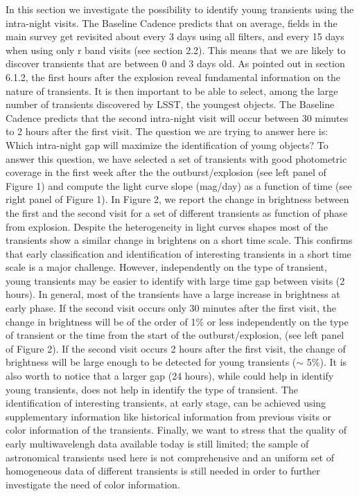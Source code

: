 In this section we investigate the possibility to identify young transients using the intra-night visits. The Baseline Cadence predicts that on average, fields in the main survey get revisited about every 3 days using all filters, and every 15 days when using only r band visits (see section 2.2).  This means that we are likely to discover transients that are between 0 and 3 days old. As pointed out in section 6.1.2, the first hours after the explosion reveal fundamental information on the nature of transients. It is then important to be able to select, among the large number of transients discovered by LSST, the youngest objects. The Baseline Cadence predicts that the second intra-night visit will occur between 30 minutes to 2 hours after the first visit.  The question we are trying to answer here is: Which intra-night gap will maximize the identification of young objects?
To answer this question, we have selected a set of transients with good photometric coverage in the first week after the the outburst/explosion (see left panel of Figure 1) and compute the light curve slope (mag/day) as a function of time (see right panel of Figure 1). In Figure 2,  we report the change in brightness between the first and the second visit for a set of different transients as function of phase from explosion. Despite the heterogeneity in light curves shapes most of the transients show a similar change in brightens on a short time scale. 
This confirms that early classification and identification of interesting transients in a short time scale is a major challenge. However, independently on the type of transient, young transients may be easier to identify with large time gap between visits (2 hours). In general, most of the transients have a large increase in brightness at early phase. 
If the second visit occurs only 30 minutes after the first visit, the change in brightness will be of the order of 1$\%$ or less independently on the type of transient or the time from the start of the outburst/explosion, (see left panel of Figure 2). If the second visit occurs 2 hours after the first visit, the change of brightness will be large enough to be detected for young transients ($\sim$ 5$\%$). 
It is also worth to notice that a larger gap (24 hours), while could help in identify young transients, does not help in identify the type of transient.  The identification of interesting transients, at early stage, can be achieved using supplementary information like historical information from previous visits or color information of the transients.
Finally, we want to stress that the quality of early multiwavelengh data available today is still limited; the sample of astronomical transients used here is not comprehensive and an uniform set of homogeneous data of different transients is still needed in order to further investigate the need of color information. 


